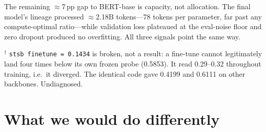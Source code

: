 \documentclass[11pt,a4paper]{article}
\begin{document}
The remaining $\approx$7\,pp gap to BERT-base is capacity, not allocation. The final model's
lineage processed $\approx$2.18B tokens---78 tokens per parameter, far past any compute-optimal
ratio---while validation loss plateaued at the eval-noise floor and zero dropout produced no
overfitting. All three signals point the same way.

\vspace{0.5em}
\noindent
$^\dagger$ \texttt{stsb finetune = 0.1434} is broken, not a result: a fine-tune cannot
legitimately land four times below its own frozen probe (0.5853). It read 0.29--0.32 throughout
training, i.e.\ it diverged. The identical code gave 0.4199 and 0.6111 on other backbones.
Undiagnosed.

\section{What we would do differently}\label{sec:lessons}
\end{document}
